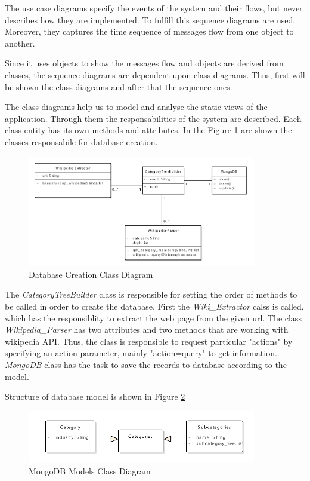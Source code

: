 The use case diagrams specify the events of the system and their flows, but never describes how they are implemented. To fulfill this sequence diagrams are used. Moreover, they captures the time sequence of messages flow from one object to another. 

Since it uses objects to show the messages flow and objects are derived from classes, the sequence diagrams are dependent upon class diagrams. Thus, first will be shown the class diagrams and after that the sequence ones. 

The class diagrams help us to model and analyse the static views of the application. Through them the responsabilities of the system are described. Each class entity has its own methods and attributes. In the Figure \ref{classCreate_uml} are shown the classes responsabile for database creation. 

\begin{figure}[!ht]
\centering
\includegraphics[width=10cm]{create-db}
\caption{Database Creation Class Diagram}\label{classCreate_uml}
\end{figure}

The \textit{CategoryTreeBuilder} class is responsible for setting the order of methods to be called in order to create the database. First the \textit{Wiki\_Extractor} calss is called, which has the responsiblity to extract the web page from the given url. The class \textit{Wikipedia\_Parser} has two attributes and two methods that are working with wikipedia API. Thus, the class is responsible to request particular "actions" by specifying an action parameter, mainly "action=query" to get information.. \textit{MongoDB} class has the task to save the records to database according to the model.  

Structure of database model is shown in Figure \ref{classMongo_uml}

\begin{figure}[!ht]
\centering
\includegraphics[width=10cm]{MongoDB}
\caption{MongoDB Models Class Diagram}\label{classMongo_uml}
\end{figure}


